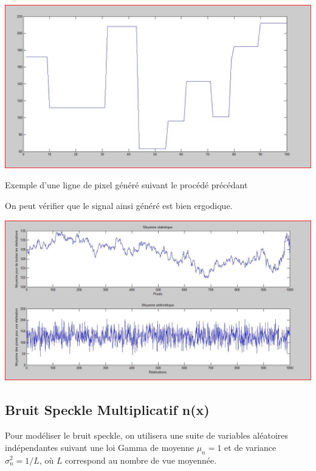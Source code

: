 \documentclass[a4paper,11pt]{article}
\newcommand{\FSource}[1]{%
  
  }
\begin{document}
\vspace{0.5cm}

\FSource{matlab/genligne.m}

\vspace{0.5cm}

\includegraphics[width=15cm]{capture/Capturer.JPG}
\begin{center}Exemple d'une ligne de pixel généré suivant le procédé
précédant\end{center}

On peut vérifier que le signal ainsi généré est bien ergodique.

\includegraphics[width=15cm]{capture/ergo.JPG}

\subsection{Bruit Speckle Multiplicatif n(x)}

Pour modéliser le bruit speckle, on utilisera une suite de variables aléatoires indépendantes suivant une loi Gamma de moyenne $\mu_n = 1$ et de variance $\sigma_n^2 = 1/L$, où $L$ correspond au nombre de vue moyennée.

\vspace{0.5cm}
\end{document}
